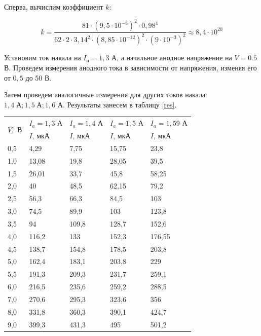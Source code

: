 \documentclass[a4paper, 12pt]{article}
\begin{document}
	Сперва, вычислим коэффициент $ k $:
	
	\begin{equation}\label{}
		k = \frac{81 \cdot (9,5 \cdot 10 ^ {-3}) ^ 2 \cdot 0,98 ^ 4}{62 \cdot 2 \cdot 3, 14 ^ 2 \cdot (8,85 \cdot 10 ^ {-12}) ^ 2 \cdot (9 \cdot 10 ^ {-3})^2} \approx 8,4 \cdot 10 ^ {20}
	\end{equation}
	
	Установим ток накала на $ I_н = 1,3 $ А, а начальное анодное напряжение на $ V = 0.5  $ В.  Проведем измерения анодного тока в зависимости от напряжения, изменяя его от $ 0,5 $ до 50 В. 
	
	Затем проведем аналогичные измерения для других токов накала: $ 1,4 \; А; 1,5 \; А; 1,6 $ А. Результаты занесем в таблицу \ref{res}.
	
	\begin{table}[H]
		\centering
		\begin{tabular}{|l|l|l|l|l|}
			\hline
			\multirow{2}{*}{$V,$ В} & $I_a = 1,3$ А & $I_a = 1,4$ А & $I_a = 1,5$ А & $I_a = 1,59$ А  \\ \cline{2-5}
			& $I$, мкА & $I$, мкА & $I$, мкА & $I$, мкА \\ \hline \hline
		0,5 & 4,29  & 7,75  & 15,75  & 23,8  \\ \hline
        1.0 & 13,08  & 19,8  & 28,05  & 39,5  \\ \hline
        1,5 & 26,01  & 33,7  & 45,8  & 58,25  \\ \hline
        2,0 & 40  & 48,5  & 62,15  & 79,2  \\ \hline
        2,5 & 56,3  & 66,3  & 84,5  & 103  \\ \hline
        3,0 & 74,5  & 89,9  & 103  & 123,8  \\ \hline
        3,5 & 94  & 109,8  & 128,7  & 152,6  \\ \hline
        4,0 & 116,2  & 133  & 152,3  & 176,55  \\ \hline
        4,5 & 138,7  & 154,8  & 178,5  & 203,8  \\ \hline
        5,0 & 162,4  & 183,1  & 203,8  & 229  \\ \hline
        5,5 & 191,3  & 209,3  & 231,7  & 259,1  \\ \hline
        6,0 & 216,5  & 235,6  & 259,2  & 288,5  \\ \hline
        7,0 & 270,6  & 295,3  & 323,6  & 356  \\ \hline
        8,0 & 331,8  & 360,3  & 390,1  & 424,7  \\ \hline
        9,0 & 399,3  & 431,3  & 495  & 501,2  \\ \hline

\end{tabular}
\end{table}
\end{document}

